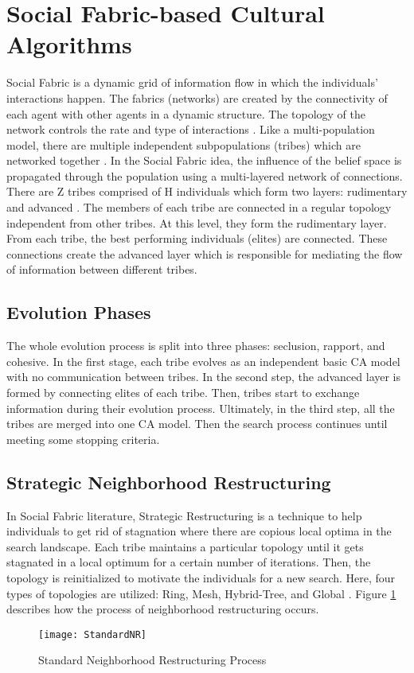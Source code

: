 \section{Social Fabric-based Cultural Algorithms}
Social Fabric is a dynamic grid of information flow in which the individuals' interactions happen. The fabrics (networks) are created by the connectivity of each agent with other agents in a dynamic structure. The topology of the network controls the rate and type of interactions \cite{reynolds2008social}. Like a multi-population model, there are multiple independent subpopulations (tribes) which are networked together \cite{ali2012socio}.\newline
In the Social Fabric idea, the influence of the belief space is propagated through the population using a multi-layered network of connections. There are Z tribes comprised of H individuals which form two layers: rudimentary and advanced \cite{ali2012socio} \cite{ali2016leveraged}. The members of each tribe are connected in a regular topology independent from other tribes. At this level, they form the rudimentary layer. From each tribe, the best performing individuals (elites) are connected. These connections create the advanced layer which is responsible for mediating the flow of information between different tribes.
\subsection{Evolution Phases}The whole evolution process is split into three phases: seclusion, rapport, and cohesive. In the first stage, each tribe evolves as an independent basic CA model with no communication between tribes. In the second step, the advanced layer is formed by connecting elites of each tribe. Then, tribes start to exchange information during their evolution process. Ultimately, in the third step, all the tribes are merged into one CA model. Then the search process continues until meeting some stopping criteria.
\subsection{Strategic Neighborhood Restructuring}In Social Fabric literature, Strategic Restructuring is a technique to help individuals to get rid of stagnation where there are copious local optima in the search landscape. Each tribe maintains a particular topology until it gets stagnated in a local optimum for a certain number of iterations. Then, the topology is reinitialized to motivate the individuals for a new search. Here, four types of topologies are utilized: Ring, Mesh, Hybrid-Tree, and Global \cite{ali2016leveraged}. Figure \ref{fig:StandardNR} describes how the process of neighborhood restructuring occurs.
\begin{figure}[h]
	\texttt{[image: StandardNR]}
	\centering
	\caption{Standard Neighborhood Restructuring Process}
	\label{fig:StandardNR}
\end{figure}

